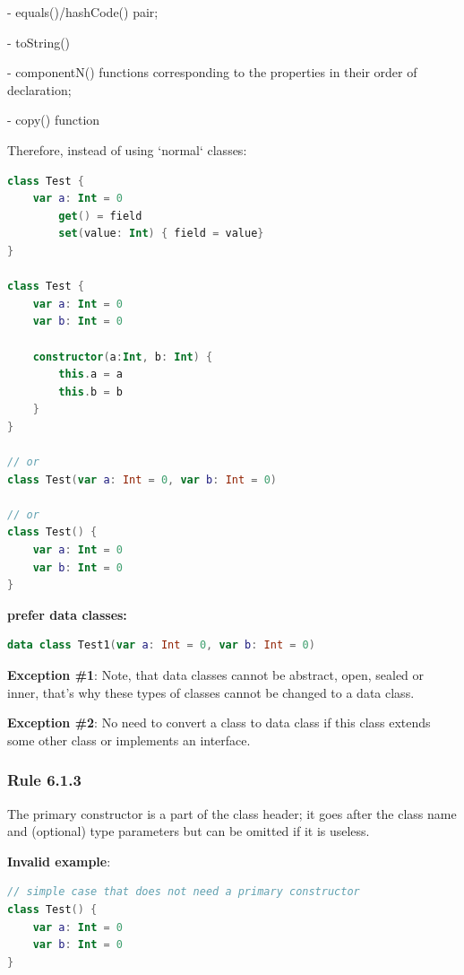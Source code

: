{{{{- equals()/hashCode() pair;

- toString()

- componentN() functions corresponding to the properties in their order of declaration;

- copy() function



Therefore, instead of using `normal` classes:



\begin{lstlisting}[language=Kotlin]
class Test {
    var a: Int = 0
        get() = field
        set(value: Int) { field = value}
}

class Test {
    var a: Int = 0
    var b: Int = 0

    constructor(a:Int, b: Int) {
        this.a = a
        this.b = b
    }
}

// or
class Test(var a: Int = 0, var b: Int = 0)

// or
class Test() {
    var a: Int = 0
    var b: Int = 0
}
\end{lstlisting}


\textbf{prefer data classes:}

\begin{lstlisting}[language=Kotlin]
data class Test1(var a: Int = 0, var b: Int = 0)
\end{lstlisting}


\textbf{Exception \#1}: Note, that data classes cannot be abstract, open, sealed or inner, that's why these types of classes cannot be changed to a data class.



\textbf{Exception \#2}: No need to convert a class to data class if this class extends some other class or implements an interface.



\subsubsection*{\textbf{Rule 6.1.3}}
\leavevmode\newline

The primary constructor is a part of the class header; it goes after the class name and (optional) type parameters but can be omitted if it is useless.



\textbf{Invalid example}:

\begin{lstlisting}[language=Kotlin]
// simple case that does not need a primary constructor
class Test() {
    var a: Int = 0
    var b: Int = 0
}


\end{lstlisting}}}}}

